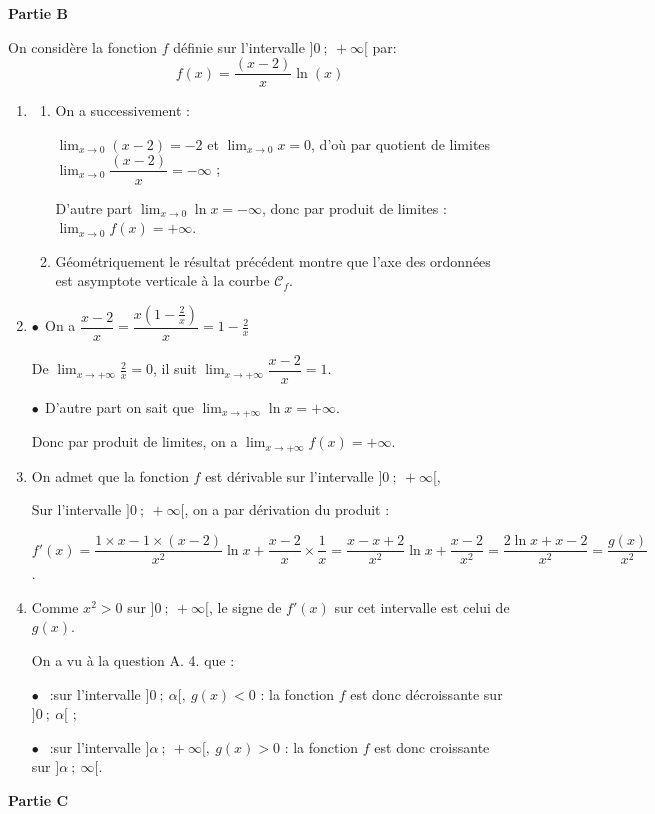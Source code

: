 \documentclass[10pt]{article}
\begin{document}
\medskip

\textbf{Partie B}

\medskip

On considère la fonction $f$ définie sur l'intervalle $]0~;~+\infty[$ par:
\[f(x) = \dfrac{(x-2)}{x}\ln(x)\]

\begin{enumerate}
\item 
	\begin{enumerate}
		\item 
On a successivement :

$\displaystyle\lim_{x \to 0} (x - 2) = - 2$ et $\displaystyle\lim_{x \to 0} x  = 0$, d'où par quotient de limites $\displaystyle\lim_{x \to 0} \dfrac{(x - 2)}{x} = - \infty$ ;

D'autre part $\displaystyle\lim_{x \to 0} \ln x = - \infty$, donc par produit de limites : $\displaystyle\lim_{x \to 0} f(x) = + \infty.$
		\item 
		Géométriquement le résultat précédent montre que l'axe des ordonnées est asymptote verticale à la courbe $\mathcal{C}_f$.
	\end{enumerate}
\item 
$\bullet~~$On a $\dfrac{x - 2}{x} = \dfrac{x\left(1 - \frac2x\right)}{x} = 1 - \frac2x$

De $\displaystyle\lim_{x \to + \infty} \frac2x = 0$, il suit $\displaystyle\lim_{x \to + \infty}\dfrac{x - 2}{x} = 1$.

$\bullet~~$D'autre part on sait que $\displaystyle\lim_{x \to + \infty}\ln x = + \infty$. 

Donc par produit de limites, on a $\displaystyle\lim_{x \to + \infty}f(x) = + \infty$.
\item On admet que la fonction $f$ est dérivable sur l'intervalle $]0~;~+\infty[$,


Sur l'intervalle $]0~;~+\infty[$, on a par dérivation du produit :

$f'(x) = \dfrac{1 \times x - 1 \times (x - 2)}{x^2}\ln x + \dfrac{x - 2}{x} \times \dfrac1x = \dfrac{x - x + 2}{x^2}\ln x + \dfrac{x - 2}{x^2} = \dfrac{2\ln x + x - 2}{x^2} = \dfrac{g(x)}{x^2}$.
\item  
Comme $x^2 > 0$ sur $]0~;~+\infty[$, le signe de $f'(x)$ sur cet intervalle est celui de $g(x)$.

On a vu à la question A. 4. que :

$\bullet~~$ :sur l'intervalle $]0~;~\alpha[, \: g(x) < 0$ : la fonction $f$ est donc décroissante sur $]0~;~\alpha[$ ;

$\bullet~~$ :sur l'intervalle $]\alpha~;~+ \infty[, \: g(x) > 0$ : la fonction $f$ est donc croissante sur $]\alpha~;~\infty[$.
\end{enumerate}
\medskip
\textbf{Partie C}
\medskip
\end{document}
